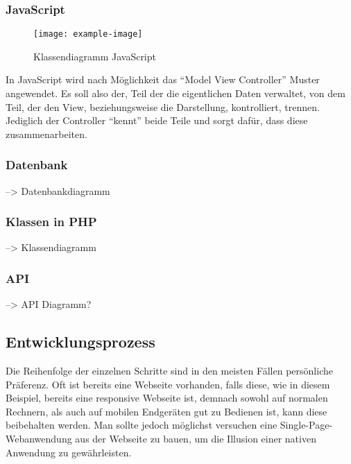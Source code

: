 \documentclass[a4paper,12pt,ngerman,listof=numbered]{scrartcl}      %
\let\oldcite\cite
\renewcommand{\cite}[1]{\textsuperscript{\oldcite{#1}}}
\begin{document}
	\subsubsection{JavaScript}
	\begin{figure}
		\centering
		\texttt{[image: example-image]}
		\caption{Klassendiagramm JavaScript}
	\end{figure}
	In JavaScript wird nach Möglichkeit das ``Model View Controller''\cite{wikiMVC} Muster angewendet. Es soll also der, Teil der die eigentlichen Daten verwaltet, von dem Teil, der den View, beziehungsweise die Darstellung, kontrolliert, trennen. Jediglich der Controller ``kennt'' beide Teile und sorgt dafür, dass diese zusammenarbeiten.
	\subsubsection{Datenbank}
	--> Datenbankdiagramm
	\subsubsection{Klassen in PHP}
	--> Klassendiagramm
	\subsubsection{API}
	--> API Diagramm?
	\subsection{Entwicklungsprozess}
	Die Reihenfolge der einzelnen Schritte sind in den meisten Fällen persönliche Präferenz. Oft ist bereits eine Webseite vorhanden, falls diese, wie in diesem Beispiel, bereits eine responsive Webseite ist, demnach sowohl auf normalen Rechnern, als auch auf mobilen Endgeräten gut zu Bedienen ist, kann diese beibehalten werden. Man sollte jedoch möglichst versuchen eine Single-Page-Webanwendung\cite{singlePageWiki} aus der Webseite zu bauen, um die Illusion einer nativen Anwendung zu gewährleisten.\par
	
\end{document}
